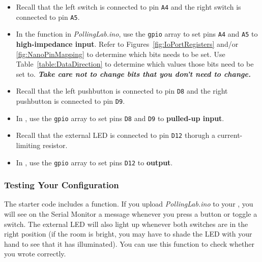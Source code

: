     \begin{itemize}
    \item Recall that the left switch is connected to pin \texttt{A4} and the
        right switch is connected to pin \texttt{A5}.
    \item In the  function in
        \textit{PollingLab.ino}, use the \lstinline{gpio} array to set pins
        \texttt{A4} and \texttt{A5} to \textbf{high-impedance input}. Refer to
        Figures~\ref{fig:IoPortRegisters} and/or \ref{fig:NanoPinMapping} to
        determine which bits needs to be set. Use
        Table~\ref{table:DataDirection} to determine which values those bits
        need to be set to. \textbf{\textit{Take care not to change bits that
        you don't need to change.}}
    \item Recall that the left pushbutton is connected to pin \texttt{D8} and
        the right pushbutton is connected to pin \texttt{D9}.
    \item In , use the \lstinline{gpio} array to
        set pins \texttt{D8} and \texttt{D9} to \textbf{pulled-up input}.
    \item Recall that the external LED is connected to pin \texttt{D12} thorugh
        a current-limiting resistor.
    \item In , use the \lstinline{gpio} array to
        set pins \texttt{D12} to \textbf{output}.
    \end{itemize}

\subsubsection{Testing Your Configuration}

The starter code includes a  function. If you upload
\textit{PollingLab.ino} to your \nano, you will see on the Serial Monitor a
message whenever you press a button or toggle a switch. The external LED will
also light up whenever both switches are in the right position (if the room is
bright, you may have to shade the LED with your hand to see that it has
illuminated). You can use this function to check whether you wrote
 correctly.

